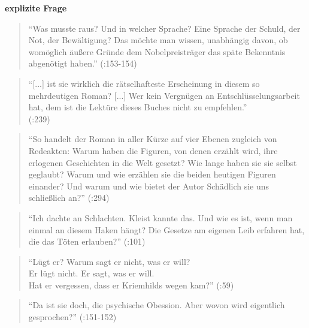 \documentclass[fontsize=12pt]{scrartcl}
\begin{document}
\textbf{explizite Frage}

\singlespacing
\begin{quote}
"`Was musste raus? Und in welcher Sprache? Eine Sprache der Schuld, der Not, der Bew\"altigung? Das m\"ochte man wissen, unabh\"angig davon, ob wom\"oglich \"au{\ss}ere Gr\"unde dem Nobelpreistr\"ager das sp\"ate Bekenntnis abgen\"otigt haben."' (\cite{Hartwig2012}:153-154)
\end{quote}
\onehalfspacing


\singlespacing
\begin{quote}
"`[...] ist sie wirklich die r\"atselhafteste Erscheinung in diesem so mehrdeutigen Roman? [...] Wer kein Vergn\"ugen an Entschl\"usselungsarbeit hat, dem ist die Lekt\"ure dieses Buches nicht zu emp\-fehlen."'\\ (\cite{Hartwig2012}:239)
\end{quote}
\onehalfspacing


\singlespacing
\begin{quote}
"`So handelt der Roman in aller K\"urze auf \mbox{vier} Ebenen zugleich von Rede\-akten: Warum haben die Figuren, von denen erz\"ahlt wird, ihre erlogenen Geschichten in die Welt gesetzt? Wie lange haben sie sie \mbox{selbst} geglaubt? Warum und wie erz\"ahlen sie die beiden heutigen Figuren einander? Und warum und wie bietet der Autor Sch\"adlich sie uns schlie{\ss}lich an?"' (\cite{Draesner2013}:294)
\end{quote}
\onehalfspacing



\singlespacing
\begin{quote}
"`Ich dachte an Schlachten. Kleist kannte das. Und wie es ist, wenn man einmal an diesem Haken h\"angt? Die Gesetze am eigenen Leib erfahren hat, die das T\"oten erlauben?"' (\cite{Draesner2013}:101)
\end{quote}
\onehalfspacing


\singlespacing
\begin{quote}
"`L\"ugt er? Warum sagt er nicht, was er will? \\ Er l\"ugt nicht. Er sagt, was er will.\\ Hat er vergessen, dass er Kriemhilds wegen kam?"' (\cite{Draesner2013}:59)
\end{quote}
\onehalfspacing

\singlespacing
\begin{quote}
"`Da ist sie doch, die psychische Obession. Aber wovon wird eigentlich gesprochen?"' (\cite{Hartwig2012}:151-152)
\end{quote}
\onehalfspacing
\end{document}
